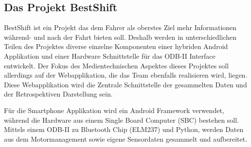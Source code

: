 \subsection{Das Projekt BestShift}

BestShift ist ein Projekt das dem Fahrer als oberstes Ziel mehr Informationen während- und nach der Fahrt bieten soll. 
Deshalb werden in unterschiedlichen Teilen des Projektes 
diverse einzelne Komponenten einer hybriden Android Applikation und einer Hardware Schnittstelle für das ODB-II 
Interface entwickelt. Der Fokus des Medientechnischen Aspektes dieses Projektes soll allerdings auf der Webapplikation,
die das Team ebenfalls realisieren wird, liegen. Diese Webapplikation wird die Zentrale Schnittstelle der gesammelten Daten
und der Retrospektiven Darstellung sein. 

Für die Smartphone Applikation wird ein Android Framework verwendet, 
während die Hardware aus einem Single Board Computer (SBC) bestehen soll. 
Mittels einem ODB-II zu Bluetooth Chip (ELM237) und Python, 
werden Daten aus dem Motormanagement sowie eigene Sensordaten gesammelt und aufbereitet. 

\clearpage %